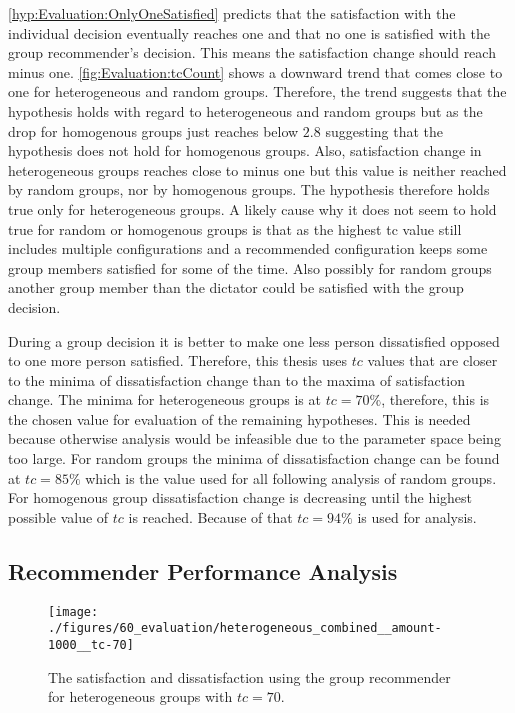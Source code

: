 \autoref{hyp:Evaluation:OnlyOneSatisfied} predicts that the satisfaction with the individual decision eventually reaches one and that no one is satisfied with the group recommender's decision. This means the satisfaction change should reach minus one. \autoref{fig:Evaluation:tcCount} shows a downward trend that comes close to one for heterogeneous and random groups. Therefore, the trend suggests that the hypothesis holds with regard to heterogeneous and random groups but as the drop for homogenous groups just reaches below $2.8$ suggesting that the hypothesis does not hold for homogenous groups. Also, satisfaction change in heterogeneous groups reaches close to minus one but this value is neither reached by random groups, nor by homogenous groups. The hypothesis therefore holds true only for heterogeneous groups. A likely cause why it does not seem to hold true for random or homogenous groups is that as the highest tc value still includes multiple configurations and a recommended configuration keeps some group members satisfied for some of the time. Also possibly for random groups another group member than the dictator could be satisfied with the group decision.

During a group decision it is better to make one less person dissatisfied opposed to one more person satisfied. Therefore, this thesis uses $tc$ values that are closer to the minima of dissatisfaction change than to the maxima of satisfaction change. The minima for heterogeneous groups is at $tc = 70\%$, therefore, this is the chosen value for evaluation of the remaining hypotheses. This is needed because otherwise analysis would be infeasible due to the parameter space being too large. For random groups the minima of dissatisfaction change can be found at $tc = 85\%$ which is the value used for all following analysis of random groups. For homogenous group dissatisfaction change is decreasing until the highest possible value of $tc$ is reached. Because of that $tc = 94\%$ is used for analysis.

\subsection{Recommender Performance Analysis}

\begin{figure}[p]
    \centering
    \texttt{[image: ./figures/60\_evaluation/heterogeneous\_combined\_\_amount-1000\_\_tc-70]}
    \caption{The satisfaction and dissatisfaction using the group recommender for heterogeneous groups with $tc = 70$.}
    \label{fig:Evaluation:HeteroSatisfaction}
\end{figure}

